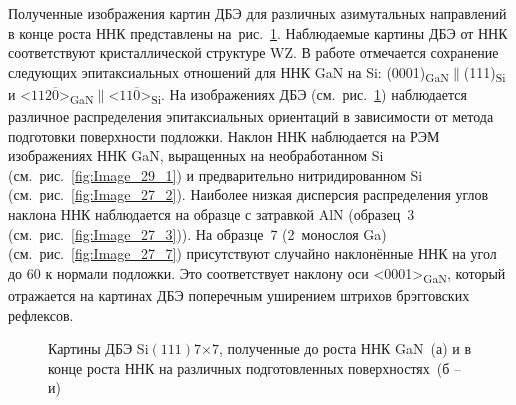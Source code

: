 Полученные изображения картин ДБЭ для различных азимутальных направлений в
конце роста ННК представлены на~рис.~\cref{fig:Image_29}. Наблюдаемые картины
ДБЭ от ННК соответствуют кристаллической структуре WZ. В работе
\cite{Wierzbicka2013} отмечается сохранение следующих эпитаксиальных отношений
для ННК GaN на Si:
(0001)\textsubscript{GaN}\(\parallel\)(111)\textsubscript{Si} и
<\(112\overline{0}\)>\textsubscript{GaN}\(\parallel\)<\(11\overline{0}\)>\textsubscript{Si}.
На изображениях ДБЭ (см.~рис.~\cref{fig:Image_29}) наблюдается различное
распределения эпитаксиальных ориентаций в зависимости от метода подготовки
поверхности подложки. Наклон ННК наблюдается на РЭМ изображениях ННК GaN,
выращенных на необработанном Si (см.~рис.~\cref{fig:Image_29_1}) и
предварительно нитридированном Si (см.~рис.~\cref{fig:Image_27_2}). Наиболее
низкая дисперсия распределения углов наклона ННК наблюдается на образце с
затравкой AlN (образец~3 (см.~рис.~\cref{fig:Image_27_3})). На образце~7
(2~монослоя Ga) (см.~рис.~\cref{fig:Image_27_7}) присутствуют случайно
наклонённые ННК на угол до 60{\textdegree} к нормали подложки. Это
соответствует наклону оси <0001>\textsubscript{GaN}, который отражается на
картинах ДБЭ поперечным уширением штрихов брэгговских рефлексов.

\begin{figure}[ht]   \caption{Картины ДБЭ
				Si\((111)7\)\(\times\)\(7\), полученные до роста ННК GaN~(а) и в конце
				роста ННК на различных подготовленных поверхностях~(б --
		и)}\label{fig:Image_29} \end{figure}

